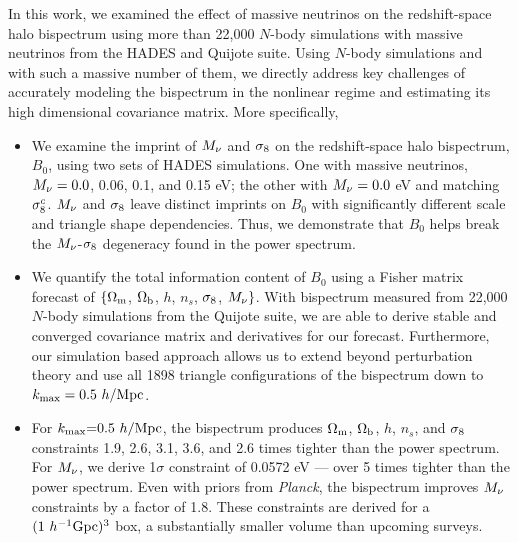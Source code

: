 In this work, we examined the effect of massive neutrinos on the redshift-space 
halo bispectrum using more than 22,000 $N$-body simulations with massive neutrinos
from the HADES and Quijote suite. Using $N$-body simulations and with such a massive 
number of them, we directly address key challenges of accurately modeling the 
bispectrum in the nonlinear regime and estimating its high dimensional covariance 
matrix. More specifically, 
\begin{itemize}
    \item We examine the imprint of $M_\nu$ and $\sigma_8$ on the redshift-space halo bispectrum, 
        $B_0$, using two sets of HADES simulations. One with massive neutrinos, $M_\nu = 0.0$, 0.06, 
        0.1, and 0.15 eV; the other with $M_\nu = 0.0$ eV and matching $\sigma_8^{c}$. 
        $M_\nu$ and $\sigma_8$ leave distinct imprints on $B_0$ with significantly different 
        scale and triangle shape dependencies. Thus, we demonstrate that $B_0$ helps 
        break the $M_\nu$-$\sigma_8$ degeneracy found in the power spectrum. 
    \item We quantify the total information content of $B_0$ using a Fisher matrix forecast of 
        $\{\Omega_{\rm m}$, $\Omega_{\rm b}$, $h$, $n_s$, $\sigma_8$, $M_\nu\}$. With bispectrum measured from 22,000 
        $N$-body simulations from the Quijote suite, we are able to derive stable and converged 
        covariance matrix and derivatives for our forecast. Furthermore, our simulation 
        based approach allows us to extend beyond perturbation theory and use all 1898 
        triangle configurations of the bispectrum down to $k_{\rm max} = 0.5~h/{\rm Mpc}$.
    \item For $k_{\rm max}{=}0.5~h/{\rm Mpc}$, the bispectrum produces $\Omega_{\rm m}$, $\Omega_{\rm b}$, $h$, $n_s$, and 
        $\sigma_8$ constraints 1.9, 2.6, 3.1, 3.6, and 2.6 times tighter than the power spectrum. 
        For $M_\nu$, we derive 1$\sigma$ constraint of 0.0572 eV --- over 5 times tighter than 
        the power spectrum. Even with priors from {\em Planck}, the bispectrum improves 
        $M_\nu$ constraints by a factor of 1.8. These constraints are derived for a 
        $(1~h^{-1}{\rm Gpc})^3$ box, a substantially smaller volume than upcoming surveys.
\end{itemize}

